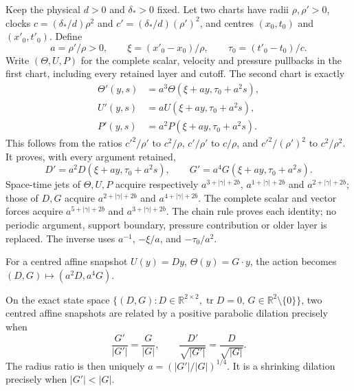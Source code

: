 Keep the physical $d>0$ and $\delta_*>0$ fixed.  Let two charts have
radii $\rho,\rho'>0$, clocks $c=(\delta_*/d)\rho^2$ and
$c'=(\delta_*/d)(\rho')^2$, and centres $(x_0,t_0)$ and
$(x'_0,t'_0)$.  Define
\[
 a=\rho'/\rho>0,\qquad
 \xi=(x'_0-x_0)/\rho,\qquad \tau_0=(t'_0-t_0)/c.
\]
Write $(\Theta,U,P)$ for the complete scalar, velocity and pressure
pullbacks in the first chart, including every retained layer and
cutoff.  The second chart is exactly
\begin{equation}\label{irc:full-chart}
 \begin{aligned}
 \Theta'(y,s)&=a^3\Theta(\xi+ay,\tau_0+a^2s),\\
 U'(y,s)&=aU(\xi+ay,\tau_0+a^2s),\\
 P'(y,s)&=a^2P(\xi+ay,\tau_0+a^2s).
 \end{aligned}
\end{equation}
This follows from the ratios $c'^2/\rho'$ to $c^2/\rho$,
$c'/\rho'$ to $c/\rho$, and $c'^2/(\rho')^2$ to $c^2/\rho^2$.
It proves, with every argument retained,
\begin{equation}\label{irc:gradient-chart}
 D'=a^2D(\xi+ay,\tau_0+a^2s),\qquad
 G'=a^4G(\xi+ay,\tau_0+a^2s).
\end{equation}
Space-time jets of $\Theta,U,P$ acquire respectively
$a^{3+|\gamma|+2b}$, $a^{1+|\gamma|+2b}$ and
$a^{2+|\gamma|+2b}$; those of $D,G$ acquire
$a^{2+|\gamma|+2b}$ and $a^{4+|\gamma|+2b}$.
The complete scalar and vector forces acquire
$a^{5+|\gamma|+2b}$ and $a^{3+|\gamma|+2b}$.
The chain rule proves each identity; no periodic argument, support
boundary, pressure contribution or older layer is replaced.
The inverse uses $a^{-1}$, $-\xi/a$, and $-\tau_0/a^2$.

For a centred affine snapshot $U(y)=Dy$, $\Theta(y)=G\cdot y$,
the action becomes $(D,G)\mapsto(a^2D,a^4G)$.

\begin{proposition}\label{irc:orbit-classification}
On the exact state space
$\{(D,G):D\in\mathbb R^{2\times2},\operatorname{tr}D=0,\,
G\in\mathbb R^2\setminus\{0\}\}$, two centred affine snapshots are
related by a positive parabolic dilation precisely when
\begin{equation}\label{irc:complete-invariants}
 \frac{G'}{|G'|}=\frac G{|G|},\qquad
 \frac{D'}{\sqrt{|G'|}}=\frac D{\sqrt{|G|}}.
\end{equation}
The radius ratio is then uniquely
$a=(|G'|/|G|)^{1/4}$.  It is a shrinking dilation precisely when
$|G'|<|G|$.
\end{proposition}

